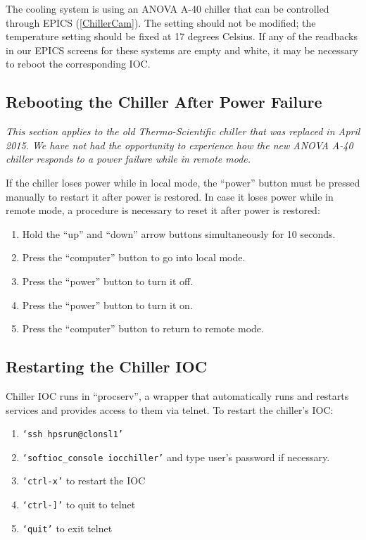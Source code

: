 \documentclass[12pt]{article}
\begin{document}
{   The cooling system is using an ANOVA A-40 chiller that can be controlled through EPICS (\ref{ChillerCam}). The setting should not be modified; the temperature setting should be fixed at 17 degrees Celsius.  If any of the readbacks in our EPICS screens for these systems are empty and white, it may be necessary to reboot the corresponding IOC. 
     \subsection{Rebooting the Chiller After Power Failure}
     {\em This section applies to the old Thermo-Scientific chiller that was replaced in April 2015.  We have not had the opportunity to experience how the new ANOVA A-40 chiller responds to a power failure while in remote mode.}

     If the chiller loses power while in local mode, the ``power'' button must be pressed manually to restart it after power is restored.  In case it loses power while in remote mode, a procedure is necessary to reset it after power is restored:
   {\footnotesize
     \begin{enumerate}
         \item Hold the ``up'' and ``down'' arrow buttons simultaneously for 10 seconds.
         \item Press the ``computer'' button to go into local mode.
         \item Press the ``power'' button to turn it off.
         \item Press the ``power'' button to turn it on.
         \item Press the ``computer'' button to return to remote mode.
    \end{enumerate}
    }

    \subsection{Restarting the Chiller IOC}
    Chiller IOC runs in ``procserv'', a wrapper that automatically runs and restarts services and provides access to them via telnet.  To restart the chiller's IOC:
   {\footnotesize
   \begin{enumerate}
       \item \texttt{`ssh hpsrun@clonsl1'}
       \item \texttt{`softioc\_console iocchiller'} and type user's password if necessary.
       \item \texttt{`ctrl-x'} to restart the IOC
       \item \texttt{`ctrl-]'} to quit to telnet
       \item \texttt{`quit'} to exit telnet
   \end{enumerate}
   }

}
\end{document}

